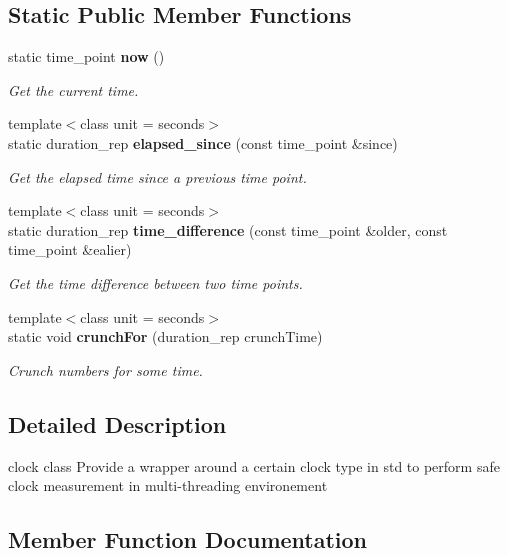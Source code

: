 \subsection*{Static Public Member Functions}
\begin{DoxyCompactItemize}
\item 
\mbox{\label{classmarlin_1_1clock_ae1ba373d0ac8a8468044b57128f8b096}} 
static time\+\_\+point \textbf{ now} ()
\begin{DoxyCompactList}\small\item\em Get the current time. \end{DoxyCompactList}\item 
{\footnotesize template$<$class unit  = seconds$>$ }\\static duration\+\_\+rep \textbf{ elapsed\+\_\+since} (const time\+\_\+point \&since)
\begin{DoxyCompactList}\small\item\em Get the elapsed time since a previous time point. \end{DoxyCompactList}\item 
{\footnotesize template$<$class unit  = seconds$>$ }\\static duration\+\_\+rep \textbf{ time\+\_\+difference} (const time\+\_\+point \&older, const time\+\_\+point \&ealier)
\begin{DoxyCompactList}\small\item\em Get the time difference between two time points. \end{DoxyCompactList}\item 
{\footnotesize template$<$class unit  = seconds$>$ }\\static void \textbf{ crunch\+For} (duration\+\_\+rep crunch\+Time)
\begin{DoxyCompactList}\small\item\em Crunch numbers for some time. \end{DoxyCompactList}\end{DoxyCompactItemize}


\subsection{Detailed Description}
clock class Provide a wrapper around a certain clock type in std to perform safe clock measurement in multi-\/threading environement 

\subsection{Member Function Documentation}
\mbox{\label{classmarlin_1_1clock_adebbf0b4495a533501e7e15e6222de88}} 
